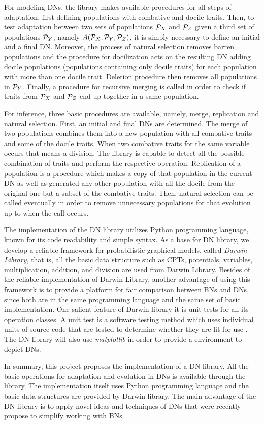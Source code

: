 For modeling DNs, the library makes available procedures for all steps of adaptation, first defining populations with combative and docile traits.
Then, to test adaptation between two sets of populations ${\cal P}_X$ and ${\cal P}_Z$ given a third set of populations ${\cal P}_Y$, namely $A({\cal P}_X, {\cal P}_Y, {\cal P}_Z)$, it is simply necessary to define an initial and a final DN.
Moreover, the process of natural selection removes barren populations and the procedure for docilization acts on the resulting DN adding docile populations (populations containing only docile traits) for each population with more than one docile trait.
Deletion procedure then removes all populations in ${\cal P}_Y$.
Finally, a procedure for recursive merging is called in order to check if traits from ${\cal P}_X$ and ${\cal P}_Z$ end up together in a same population.

For inference, three basic procedures are available, namely, merge, replication and natural selection.
First, an initial and final DNs are determined.
The merge of two populations combines them into a new population with all combative traits and some of the docile traits.
When two combative traits for the same variable occurs that means a division.
The library is capable to detect all the possible combination of traits and perform the respective operation.
Replication of a population is a procedure which makes a copy of that population in the current DN as well as generated any other population with all the docile from the original one but a subset of the combative traits.
Then, natural selection can be called eventually in order to remove unnecessary populations for that evolution up to when the call occurs.

The implementation of the DN library utilizes Python programming language, known for its code readability and simple syntax.
As a base for DN library, we develop a reliable framework for probabilistic graphical models, called \emph{Darwin Library}, that is, all the basic data structure such as CPTs, potentials, variables, multiplication, addition, and division are used from Darwin Library.
Besides of the reliable implementation of Darwin Library, another advantage of using this framework is to provide a platform for fair comparison between BNs and DNs, since both are in the same programming language and the same set of basic implementation.
One salient feature of Darwin library it is unit tests for all its operation classes.
A unit test is a software testing method which uses individual units of source code that are tested to determine whether they are fit for use \cite{kolawa2007automated}.
The DN library will also use \emph{matplotlib} \cite{Hunter:2007} in order to provide a environment to depict DNs.

In summary, this project proposes the implementation of a DN library.
All the basic operations for adaptation and evolution in DNs is available through the library.
The implementation itself uses Python programming language and the basic data structures are provided by Darwin library.
The main advantage of the DN library is to apply novel ideas and techniques of DNs that were recently propose to simplify working with BNs.

